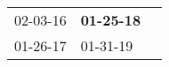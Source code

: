 \begin{supertabular}{p{0.33\columnwidth}p{0.33\columnwidth}p{0.33\columnwidth}}
 02-03-16\textsuperscript{} &  \textbf{01-25-18\textsuperscript{}} \\
 01-26-17\textsuperscript{} &           01-31-19\textsuperscript{} \\
\end{supertabular}
